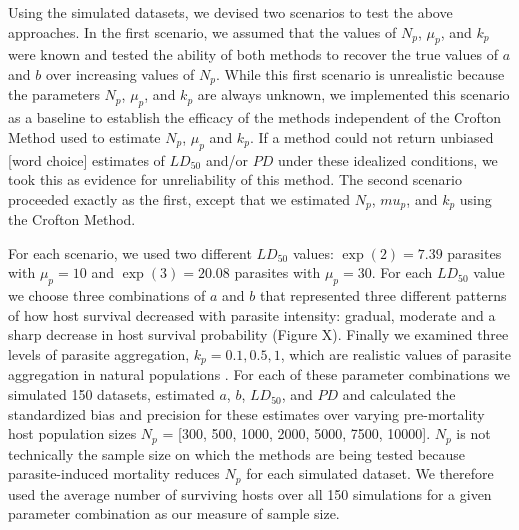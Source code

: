 \documentclass[12pt, a4paper]{article}
\begin{document}

Using the simulated datasets, we devised two scenarios to test the above approaches. In the first scenario, we assumed
that the values of $N_p$, $\mu_p$, and $k_p$ were known and tested the ability of both
methods to recover the true values of $a$ and $b$ over increasing values of
$N_p$.  While this first scenario is unrealistic because the parameters $N_p$,
$\mu_p$, and $k_p$ are always unknown, we implemented this scenario as a baseline to
establish the efficacy of the methods independent of the Crofton Method used to estimate $N_p$, $\mu_p$ and $k_p$.   If a
method could not return unbiased [word choice] estimates of $LD_{50}$ and/or $PD$ under these
idealized conditions, we took this as evidence for unreliability of this method. The second scenario
proceeded exactly as the first, except that we estimated $N_p$, $mu_p$, and
$k_p$ using the Crofton Method.

For each scenario, we used two different $LD_{50}$
values: $\exp(2) = 7.39$ parasites with $\mu_p = 10$ and $\exp(3) = 20.08$ parasites with  $\mu_p = 30$. For each $LD_{50}$ value we choose three combinations of $a$ and $b$ that
represented three different patterns of how host survival decreased with
parasite intensity:  gradual, moderate and a sharp decrease in host survival
probability (Figure X).  Finally we examined three levels of parasite
aggregation, $k_p = 0.1, 0.5, 1$, which are realistic values of parasite aggregation in
natural populations \citep{Shaw1998}.  For each of these parameter
combinations we simulated 150 datasets, estimated $a$, $b$, $LD_{50}$, and $PD$ and calculated the standardized bias and
precision \citep{Walther2005} for these estimates over varying pre-mortality host population sizes  $N_p$ = [300, 500, 1000, 2000, 5000, 7500,
10000]. $N_p$ is not technically the sample size on which the methods are being
tested because parasite-induced mortality reduces $N_p$ for each simulated
dataset.  We therefore used the average number of surviving hosts over all 150 simulations for a given parameter combination as our measure of sample size.
\end{document}
